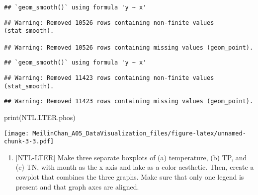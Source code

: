 \documentclass[
]{article}
\newenvironment{Shaded}{\begin{snugshade}}{\end{snugshade}}
\newcommand{\FunctionTok}[1]{\textcolor[rgb]{0.00,0.00,0.00}{#1}}
\newcommand{\NormalTok}[1]{#1}
\providecommand{\tightlist}{%
  \setlength{\itemsep}{0pt}\setlength{\parskip}{0pt}}
\begin{document}
\begin{verbatim}
## `geom_smooth()` using formula 'y ~ x'
\end{verbatim}

\begin{verbatim}
## Warning: Removed 10526 rows containing non-finite values (stat_smooth).

## Warning: Removed 10526 rows containing missing values (geom_point).
\end{verbatim}

\begin{verbatim}
## `geom_smooth()` using formula 'y ~ x'
\end{verbatim}

\begin{verbatim}
## Warning: Removed 11423 rows containing non-finite values (stat_smooth).
\end{verbatim}

\begin{verbatim}
## Warning: Removed 11423 rows containing missing values (geom_point).
\end{verbatim}

\begin{Shaded}
\begin{Highlighting}[]
\FunctionTok{print}\NormalTok{(NTL.LTER.phos)}
\end{Highlighting}
\end{Shaded}

\texttt{[image: MeilinChan\_A05\_DataVisualization\_files/figure-latex/unnamed-chunk-3-3.pdf]}

\begin{enumerate}
\def\labelenumi{\arabic{enumi}.}
\setcounter{enumi}{4}
\tightlist
\item
  {[}NTL-LTER{]} Make three separate boxplots of (a) temperature, (b)
  TP, and (c) TN, with month as the x axis and lake as a color
  aesthetic. Then, create a cowplot that combines the three graphs. Make
  sure that only one legend is present and that graph axes are aligned.
\end{enumerate}
\end{document}
